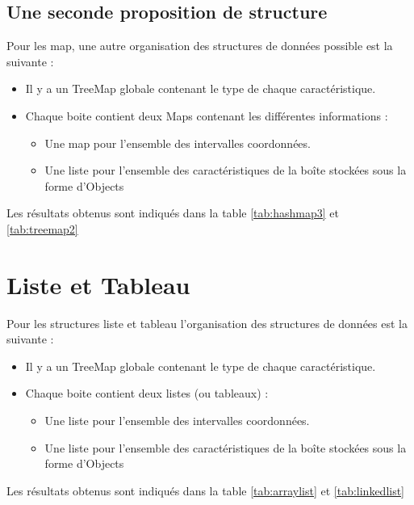 \subsection{Une seconde proposition de structure}
Pour les map, une autre organisation des structures de données possible est la suivante :
\begin{itemize}
\item Il y a un TreeMap globale contenant le type de chaque caractéristique.
 \item Chaque boite contient deux Maps contenant les différentes informations :
\begin{itemize}
 \item Une map pour l'ensemble des intervalles coordonnées.
\item Une liste pour l'ensemble des caractéristiques de la boîte stockées sous la forme d'Objects
\end{itemize}
\end{itemize}

Les résultats obtenus sont indiqués dans la table \ref{tab:hashmap3} et \ref{tab:treemap2}



\section{Liste et Tableau}
Pour les structures liste et tableau l'organisation des structures de données est la suivante :
\begin{itemize}
\item Il y a un TreeMap globale contenant le type de chaque caractéristique.
 \item Chaque boite contient deux listes (ou tableaux) :
\begin{itemize}
 \item Une liste pour l'ensemble des intervalles coordonnées.
\item Une liste pour l'ensemble des caractéristiques de la boîte stockées sous la forme d'Objects
\end{itemize}
\end{itemize}

Les résultats obtenus sont indiqués dans la table \ref{tab:arraylist} et \ref{tab:linkedlist}



